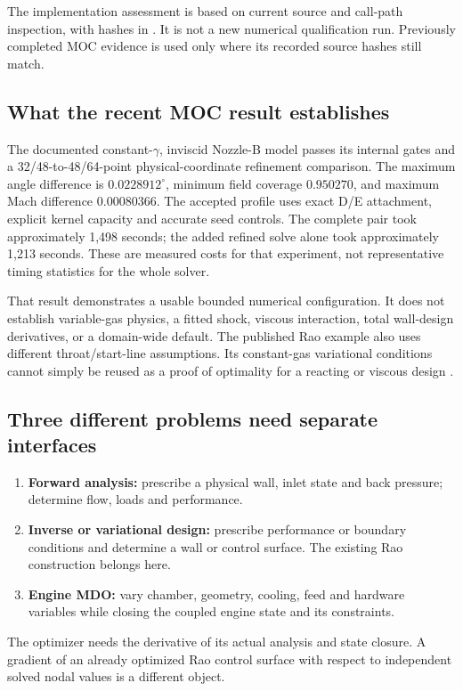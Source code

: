 The implementation assessment is based on current source and call-path
inspection, with hashes in . It is not
a new numerical qualification run. Previously completed MOC evidence is
used only where its recorded source hashes still match.

\subsection{What the recent MOC result establishes}
The documented constant-\(\gamma\), inviscid Nozzle-B model passes its
internal gates and a 32/48-to-48/64-point physical-coordinate refinement
comparison. The maximum angle difference is \(0.0228912^\circ\), minimum
field coverage \(0.950270\), and maximum Mach difference \(0.00080366\).
The accepted profile uses exact D/E attachment, explicit kernel capacity
and accurate seed controls. The complete pair took approximately
1,498 seconds; the added refined solve alone took approximately 1,213 seconds.
These are measured costs for that experiment, not representative timing
statistics for the whole solver.

That result demonstrates a usable bounded numerical configuration. It
does not establish variable-gas physics, a fitted shock, viscous interaction,
total wall-design derivatives, or a domain-wide default. The published
Rao example also uses different throat/start-line assumptions. Its
constant-gas variational conditions cannot simply be reused as a proof of
optimality for a reacting or viscous design \cite[PDF pp.~2--5]{rao1958}.

\subsection{Three different problems need separate interfaces}
\begin{enumerate}
\item \textbf{Forward analysis:} prescribe a physical wall, inlet state and
back pressure; determine flow, loads and performance.
\item \textbf{Inverse or variational design:} prescribe performance or
boundary conditions and determine a wall or control surface. The existing
Rao construction belongs here.
\item \textbf{Engine MDO:} vary chamber, geometry, cooling, feed and hardware
variables while closing the coupled engine state and its constraints.
\end{enumerate}
The optimizer needs the derivative of its actual analysis and state closure.
A gradient of an already optimized Rao control surface with respect to
independent solved nodal values is a different object.

